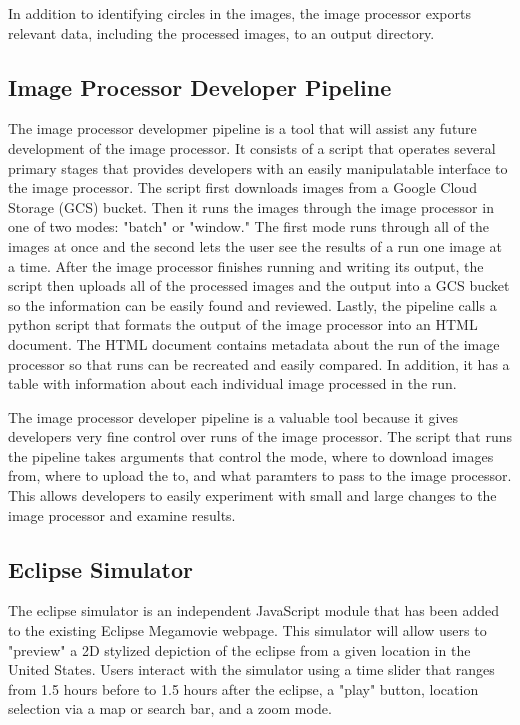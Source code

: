 \documentclass[10pt, onecolumn, draftclsnofoot, letterpaper, compsoc]{IEEEtran}
\begin{document}
In addition to identifying circles in the images, the image processor exports
relevant data, including the processed images, to an output directory. \\

\subsection{Image Processor Developer Pipeline}

The image processor developmer pipeline is a tool that will assist any future
development of the image processor. It consists of a script that operates
several primary stages that provides developers with an easily manipulatable
interface to the image processor. The script first downloads images from a
Google Cloud Storage (GCS) bucket. Then it runs the images through the image
processor in one of two modes: "batch" or "window." The first mode runs through
all of the images at once and the second lets the user see the results of a run
one image at a time. After the image processor finishes running and writing its
output, the script then uploads all of the processed images and the output into
a GCS bucket so the information can be easily found and reviewed. Lastly, the
pipeline calls a python script that formats the output of the image processor
into an HTML document. The HTML document contains metadata about the run of the
image processor so that runs can be recreated and easily compared. In addition,
it has a table with information about each individual image processed in the run.

The image processor developer pipeline is a valuable tool because it gives
developers very fine control over runs of the image processor. The script that
runs the pipeline takes arguments that control the mode, where to download
images from, where to upload the to, and what paramters to pass to the image
processor. This allows developers to easily experiment with small and large
changes to the image processor and examine results. \\

\subsection{Eclipse Simulator}

The eclipse simulator is an independent JavaScript module that has been
added to the existing Eclipse Megamovie webpage. This simulator will allow
users to "preview" a 2D stylized depiction of the eclipse from a given location
in the United States. Users interact with the simulator using a time slider
that ranges from 1.5 hours before to 1.5 hours after the eclipse, a "play" button,
location selection via a map or search bar, and a zoom mode.
\end{document}
